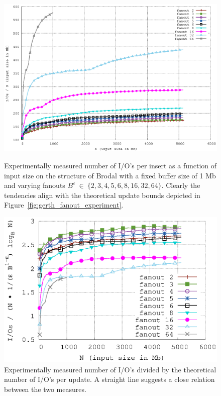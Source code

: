 \documentclass[twoside,11pt,openright]{report}
\def \epsilon {\varepsilon}
\begin{document}
\begin{figure}[h]
\centering
\includegraphics[width=\textwidth]{../src/experiments/gerth_fanout_experiment_results/2016-05-06.11_52_24/ios}
\caption{Experimentally measured number of I/O's per insert as a function of input size on the structure of Brodal with a fixed buffer size of 1 Mb and varying fanouts $B^\epsilon~\in~\{2,3,4,5,6,8,16,32,64\}$. Clearly the tendencies align with the theoretical update bounds depicted in Figure~\ref{fig:gerth_fanout_experiment}.}
\label{fig:gerth_fanout_experiment_ios}
\begin{minipage}[t]{0.48\columnwidth}
  \centering
  \includegraphics[width=\linewidth]{../src/experiments/gerth_fanout_experiment_results/2016-05-06.11_52_24/ios_divided_asymptotic}
  \caption{Experimentally measured number of I/O's divided by the theoretical number of I/O's per update. A straight line suggests a close relation between the two measures.}

\end{minipage}
\end{figure}
\end{document}

